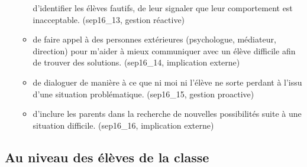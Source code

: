 \documentclass[
]{article}
\begin{document}
\begin{itemize}
\begin{itemize}
    d'identifier les élèves fautifs, de leur signaler que leur comportement est inacceptable. (sep16\_13, gestion réactive)
  \item
    de faire appel à des personnes extérieures (psychologue, médiateur, direction) pour m'aider à mieux communiquer avec un élève difficile afin de trouver des solutions. (sep16\_14, implication externe)
  \item
    de dialoguer de manière à ce que ni moi ni l'élève ne sorte perdant à l'issu d'une situation problématique. (sep16\_15, gestion proactive)
  \item
    d'inclure les parents dans la recherche de nouvelles possibilités suite à une situation difficile. (sep16\_16, implication externe)
  \end{itemize}
\end{itemize}

\hypertarget{au-niveau-des-uxe9luxe8ves-de-la-classe}{%
\subsection{Au niveau des élèves de la classe}\label{au-niveau-des-uxe9luxe8ves-de-la-classe}}
\end{document}
